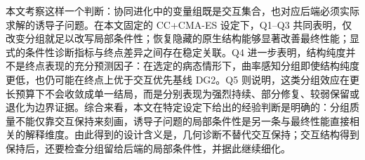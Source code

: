 本文考察这样一个判断：协同进化中的变量组既是交互集合，也对应后端必须实际求解的诱导子问题。在本文固定的 CC+CMA-ES 设定下，Q1--Q3 共同表明，仅改变分组就足以改写局部条件性；恢复隐藏的原生结构能够显著改善最终性能；显式的条件性诊断指标与终点差异之间存在稳定关联。Q4 进一步表明，结构纯度并不是终点表现的充分预测因子：在选定的病态情形下，曲率感知分组即使结构纯度更低，也仍可能在终点上优于交互优先基线 DG2。Q5 则说明，这类分组效应在更长预算下不会收敛成单一结局，而是分别表现为强烈持续、部分修复、较弱保留或退化为边界证据。综合来看，本文在特定设定下给出的经验判断是明确的：分组质量不能仅靠交互保持来刻画，诱导子问题的局部条件性是另一条与最终性能直接相关的解释维度。由此得到的设计含义是，几何诊断不替代交互保持；交互结构得到保持后，还要检查分组留给后端的局部条件性，并据此继续细化。

